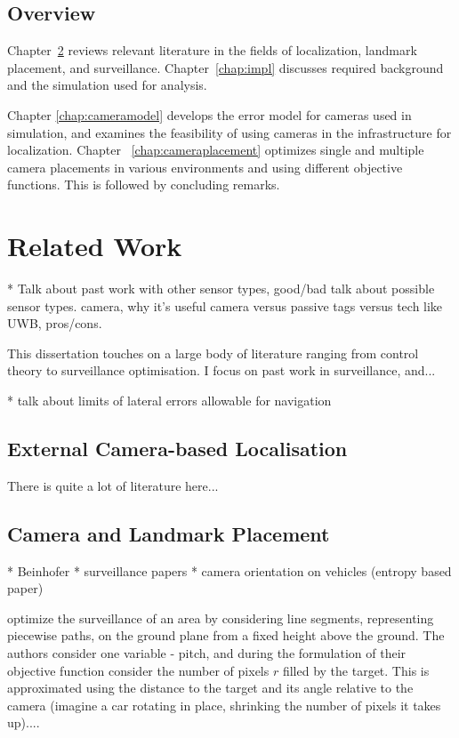 \documentclass[a4paper,12pt,twoside,openright]{report}
\begin{document}
\section{Overview}

Chapter~\ref{chap:relatedwork} reviews relevant literature in the fields of
localization, landmark placement, and surveillance. Chapter~\ref{chap:impl} discusses required background and the simulation
used for analysis. 

Chapter \ref{chap:cameramodel} develops the error model for cameras
used in simulation, and examines the feasibility of using cameras in the infrastructure for localization.
Chapter ~\ref{chap:cameraplacement} optimizes single and multiple camera placements
in various environments and using different objective functions. This is followed by concluding remarks.


\chapter{Related Work} 
\label{chap:relatedwork}

* Talk about past work with other sensor types, good/bad
talk about possible sensor types. camera, why it's useful
camera versus passive tags versus tech like UWB, pros/cons.

This dissertation touches on a large body of literature ranging from 
control theory to surveillance optimisation. I focus on past work
in surveillance, and... 

* talk about limits of lateral errors allowable for navigation


\section{External Camera-based Localisation}

There is quite a lot of literature here...

\section{Camera and Landmark Placement}

* Beinhofer
* surveillance papers
* camera orientation on vehicles (entropy based paper)

\citeauthor{bodor2007optimal} optimize the surveillance of an area by considering
line segments, representing piecewise paths, on the ground plane from a fixed
height above the ground. The authors consider one variable - pitch,
and during the formulation of their
objective function consider the number of pixels $r$ filled by the target.
This is approximated using the distance to the target and its angle relative 
to the camera (imagine a car rotating in place, shrinking the number
of pixels it takes up).... 
\end{document}
